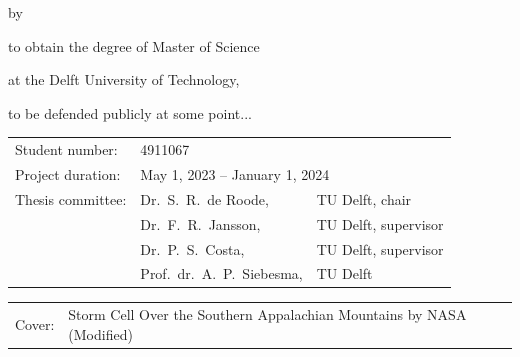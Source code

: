 \begin{titlepage}

\begin{center}

{\makeatletter
\largetitlestyle\fontsize{45}{45}\selectfont\@title
\makeatother}

{\makeatletter
\ifdefvoid{\@subtitle}{}{\bigskip\titlestyle\fontsize{20}{20}\selectfont\@subtitle}
\makeatother}

\bigskip
\bigskip

by

\bigskip
\bigskip

{\makeatletter
\largetitlestyle\fontsize{25}{25}\selectfont\@author
\makeatother}

\bigskip
\bigskip

to obtain the degree of Master of Science

at the Delft University of Technology,

to be defended publicly at some point...

\vfill

\begin{tabular}{lll}
    Student number: & 4911067 \\
    Project duration: & \multicolumn{2}{l}{May 1, 2023 -- January 1, 2024} \\
    Thesis committee: & Dr.\ S.\ R.\ de Roode, & TU Delft, chair \\
                      & Dr.\ F.\ R.\ Jansson, & TU Delft, supervisor \\
                      & Dr.\ P.\ S.\ Costa, & TU Delft, supervisor \\
                      & Prof.\ dr.\ A.\ P.\ Siebesma, & TU Delft
\end{tabular}

\bigskip
\bigskip

\bigskip
\bigskip
\begin{tabular}{p{15mm}p{10cm}}
    Cover: & Storm Cell Over the Southern Appalachian Mountains by NASA (Modified)\\
\end{tabular}


\end{center}
\end{titlepage}

